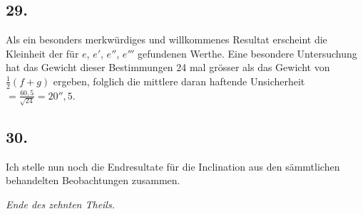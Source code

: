 \documentclass[12pt,a4paper]{article}
\begin{document}
\subsection*{29.}
Als ein besonders merkwürdiges und willkommenes Resultat erscheint die Kleinheit der für $e$, $e'$, $e''$, $e'''$ gefundenen Werthe. Eine besondere Untersuchung hat das Gewicht dieser Bestimmungen 24 mal grösser als das Gewicht von $\tfrac{1}{2}(f + g)$ ergeben, folglich die mittlere daran haftende Unsicherheit $= \frac{60{,}5}{\sqrt{24}} = 20''{,}5$.

\subsection*{30.}
Ich stelle nun noch die Endresultate für die Inclination aus den sämmtlichen behandelten Beobachtungen zusammen.

\vfill
\begin{center}
\textit{Ende des zehnten Theils.}
\end{center}
\end{document}
